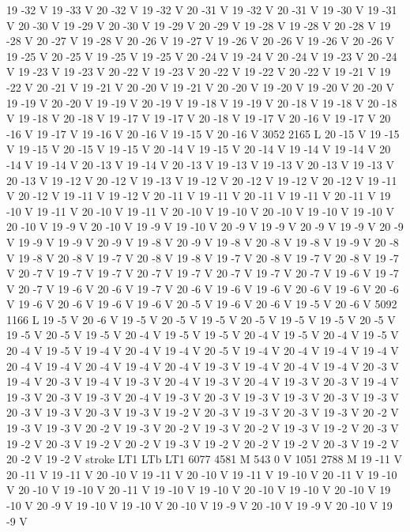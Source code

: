 {{19 -32 V
19 -33 V
20 -32 V
19 -32 V
20 -31 V
19 -32 V
20 -31 V
19 -30 V
19 -31 V
20 -30 V
19 -29 V
20 -30 V
19 -29 V
20 -29 V
19 -28 V
19 -28 V
20 -28 V
19 -28 V
20 -27 V
19 -28 V
20 -26 V
19 -27 V
19 -26 V
20 -26 V
19 -26 V
20 -26 V
19 -25 V
20 -25 V
19 -25 V
19 -25 V
20 -24 V
19 -24 V
20 -24 V
19 -23 V
20 -24 V
19 -23 V
19 -23 V
20 -22 V
19 -23 V
20 -22 V
19 -22 V
20 -22 V
19 -21 V
19 -22 V
20 -21 V
19 -21 V
20 -20 V
19 -21 V
20 -20 V
19 -20 V
19 -20 V
20 -20 V
19 -19 V
20 -20 V
19 -19 V
20 -19 V
19 -18 V
19 -19 V
20 -18 V
19 -18 V
20 -18 V
19 -18 V
20 -18 V
19 -17 V
19 -17 V
20 -18 V
19 -17 V
20 -16 V
19 -17 V
20 -16 V
19 -17 V
19 -16 V
20 -16 V
19 -15 V
20 -16 V
3052 2165 L
20 -15 V
19 -15 V
19 -15 V
20 -15 V
19 -15 V
20 -14 V
19 -15 V
20 -14 V
19 -14 V
19 -14 V
20 -14 V
19 -14 V
20 -13 V
19 -14 V
20 -13 V
19 -13 V
19 -13 V
20 -13 V
19 -13 V
20 -13 V
19 -12 V
20 -12 V
19 -13 V
19 -12 V
20 -12 V
19 -12 V
20 -12 V
19 -11 V
20 -12 V
19 -11 V
19 -12 V
20 -11 V
19 -11 V
20 -11 V
19 -11 V
20 -11 V
19 -10 V
19 -11 V
20 -10 V
19 -11 V
20 -10 V
19 -10 V
20 -10 V
19 -10 V
19 -10 V
20 -10 V
19 -9 V
20 -10 V
19 -9 V
19 -10 V
20 -9 V
19 -9 V
20 -9 V
19 -9 V
20 -9 V
19 -9 V
19 -9 V
20 -9 V
19 -8 V
20 -9 V
19 -8 V
20 -8 V
19 -8 V
19 -9 V
20 -8 V
19 -8 V
20 -8 V
19 -7 V
20 -8 V
19 -8 V
19 -7 V
20 -8 V
19 -7 V
20 -8 V
19 -7 V
20 -7 V
19 -7 V
19 -7 V
20 -7 V
19 -7 V
20 -7 V
19 -7 V
20 -7 V
19 -6 V
19 -7 V
20 -7 V
19 -6 V
20 -6 V
19 -7 V
20 -6 V
19 -6 V
19 -6 V
20 -6 V
19 -6 V
20 -6 V
19 -6 V
20 -6 V
19 -6 V
19 -6 V
20 -5 V
19 -6 V
20 -6 V
19 -5 V
20 -6 V
5092 1166 L
19 -5 V
20 -6 V
19 -5 V
20 -5 V
19 -5 V
20 -5 V
19 -5 V
19 -5 V
20 -5 V
19 -5 V
20 -5 V
19 -5 V
20 -4 V
19 -5 V
19 -5 V
20 -4 V
19 -5 V
20 -4 V
19 -5 V
20 -4 V
19 -5 V
19 -4 V
20 -4 V
19 -4 V
20 -5 V
19 -4 V
20 -4 V
19 -4 V
19 -4 V
20 -4 V
19 -4 V
20 -4 V
19 -4 V
20 -4 V
19 -3 V
19 -4 V
20 -4 V
19 -4 V
20 -3 V
19 -4 V
20 -3 V
19 -4 V
19 -3 V
20 -4 V
19 -3 V
20 -4 V
19 -3 V
20 -3 V
19 -4 V
19 -3 V
20 -3 V
19 -3 V
20 -4 V
19 -3 V
20 -3 V
19 -3 V
19 -3 V
20 -3 V
19 -3 V
20 -3 V
19 -3 V
20 -3 V
19 -3 V
19 -2 V
20 -3 V
19 -3 V
20 -3 V
19 -3 V
20 -2 V
19 -3 V
19 -3 V
20 -2 V
19 -3 V
20 -2 V
19 -3 V
20 -2 V
19 -3 V
19 -2 V
20 -3 V
19 -2 V
20 -3 V
19 -2 V
20 -2 V
19 -3 V
19 -2 V
20 -2 V
19 -2 V
20 -3 V
19 -2 V
20 -2 V
19 -2 V
stroke
LT1
LTb
LT1
6077 4581 M
543 0 V
1051 2788 M
19 -11 V
20 -11 V
19 -11 V
20 -10 V
19 -11 V
20 -10 V
19 -11 V
19 -10 V
20 -11 V
19 -10 V
20 -10 V
19 -10 V
20 -11 V
19 -10 V
19 -10 V
20 -10 V
19 -10 V
20 -10 V
19 -10 V
20 -9 V
19 -10 V
19 -10 V
20 -10 V
19 -9 V
20 -10 V
19 -9 V
20 -10 V
19 -9 V
}}
